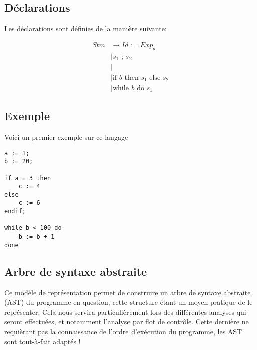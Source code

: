 \documentclass[a4paper, 12pt]{article}
\begin{document}
\subsection{Déclarations}
Les déclarations sont définies de la manière suivante:

\begin{align*}
Stm & \rightarrow Id := Exp_a \\
  & \mid s_1 \text{ ; } s_2 \\
  & \mid \\
  & \mid \text{if } b \text{ then } s_1 \text{ else } s_2 \\
  & \mid \text{while } b \text{ do } s_1
\end{align*}

\subsection{Exemple}
Voici un premier exemple sur ce langage
\begin{lstlisting}
a := 1;
b := 20;

if a = 3 then
	c := 4
else
	c := 6
endif;

while b < 100 do
	b := b + 1
done
\end{lstlisting}

\subsection{Arbre de syntaxe abstraite}
Ce modèle de représentation permet de construire un arbre de syntaxe abstraite (AST) du programme en question, 
cette structure étant un moyen pratique de le représenter. Cela nous servira particulièrement lors des différentes 
analyses qui seront effectuées, et notamment l'analyse par flot de contrôle. Cette dernière ne requièrant pas 
la connaissance de l'ordre d'exécution du programme, les AST sont tout-à-fait adaptés !

\end{document}
